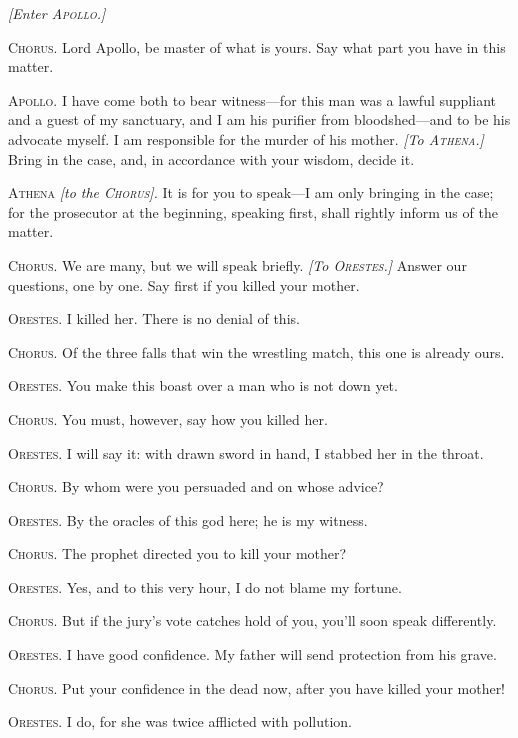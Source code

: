 \documentclass[12pt]{article}
\begin{document}
\begin{center}
\textit{[Enter \textsc{Apollo.}]}
\end{center}

\textsc{Chorus.} Lord Apollo, be master of what is yours. Say what part you have in this matter.

\textsc{Apollo.} I have come both to bear witness---for this man was a lawful suppliant and a guest of my sanctuary, and I am his purifier from bloodshed---and to be his advocate myself. I am responsible for the murder of his mother. \textit{[To \textsc{Athena.}]} Bring in the case, and, in accordance with your wisdom, decide it.

\textsc{Athena} \textit{[to the \textsc{Chorus}].} It is for you to speak---I am only bringing in the case; for the prosecutor at the beginning, speaking first, shall rightly inform us of the matter.

\textsc{Chorus.} We are many, but we will speak briefly. \textit{[To \textsc{Orestes.}]} Answer our questions, one by one. Say first if you killed your mother.

\textsc{Orestes.} I killed her. There is no denial of this.

\textsc{Chorus.} Of the three falls that win the wrestling match, this one is already ours.

\textsc{Orestes.} You make this boast over a man who is not down yet.

\textsc{Chorus.} You must, however, say how you killed her.

\textsc{Orestes.} I will say it: with drawn sword in hand, I stabbed her in the throat.

\textsc{Chorus.} By whom were you persuaded and on whose advice?

\textsc{Orestes.} By the oracles of this god here; he is my witness.

\textsc{Chorus.} The prophet directed you to kill your mother?

\textsc{Orestes.} Yes, and to this very hour, I do not blame my fortune.

\textsc{Chorus.} But if the jury's vote catches hold of you, you'll soon speak differently.

\textsc{Orestes.} I have good confidence. My father will send protection from his grave.

\textsc{Chorus.} Put your confidence in the dead now, after you have killed your mother!

\textsc{Orestes.} I do, for she was twice afflicted with pollution.
\end{document}
